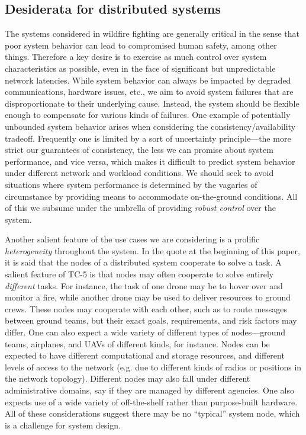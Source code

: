 \subsection{Desiderata for distributed systems}

The systems considered in wildfire fighting are generally critical in the sense
that poor
system behavior can lead to compromised human safety, among other things.
Therefore a key desire is to exercise as much control over system
characteristics as possible, even in the face of significant but unpredictable
network latencies. While system behavior can always be impacted by degraded
communications, hardware issues, etc., we aim to avoid system failures that are
disproportionate to their underlying cause. Instead, the system should be
flexible enough to compensate for various kinds of failures. One example of
potentially unbounded system behavior arises when considering the
consistency/availability tradeoff. Frequently one is limited by a sort of
uncertainty principle---the more strict our guarantees of consistency, the less
we can promise about system performance, and vice versa, which makes it
difficult to predict system behavior under different network and workload
conditions. We should seek to avoid situations where system performance is
determined by the vagaries of circumstance by providing means to accommodate
on-the-ground conditions. All of this we subsume under the umbrella of providing
\emph{robust control} over the system.

Another salient feature of the use cases we are considering is a prolific
\emph{heterogeneity} throughout
the system. In the quote at the beginning of this paper, it is said that the
nodes of a distributed system cooperate to solve a task.  A salient feature of
TC-5 is that nodes may often cooperate to solve entirely \emph{different} tasks.
For instance, the task of one drone may be to hover over and monitor a fire,
while another drone may be used to  deliver resources to ground crews. These
nodes may cooperate with each other, such as to route messages between ground
teams, but their exact goals, requirements, and risk factors may differ. One
can also expect a wide variety of different types of nodes---ground teams,
airplanes, and UAVs of different kinds, for instance. Nodes can be expected to
have different computational and storage resources, and  different levels of
access to the network (e.g. due to different kinds of radios or positions in
the network topology). Different nodes may also fall under different
administrative domains, say if they are managed by different agencies. One
also expects use of a wide variety of off-the-shelf rather than purpose-built
hardware. All of these considerations suggest there may be no ``typical''
system node, which is a challenge for system design.

